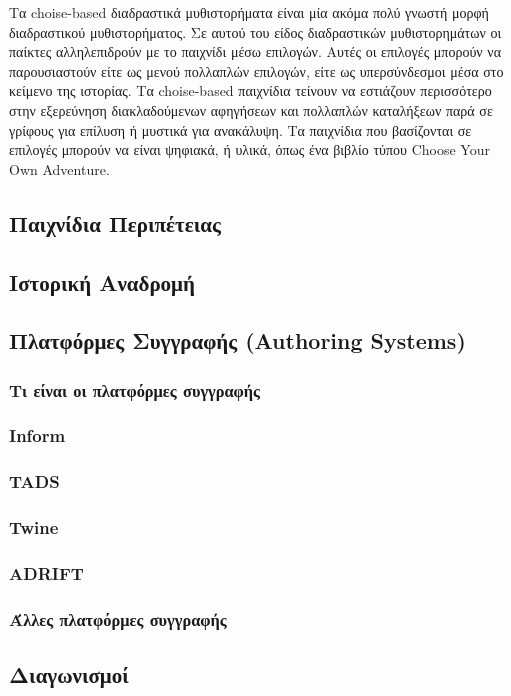 \noindent
Τα choise-based διαδραστικά μυθιστορήματα είναι μία ακόμα πολύ γνωστή μορφή διαδραστικού μυθιστορήματος. Σε αυτού του είδος διαδραστικών μυθιστορημάτων οι παίκτες αλληλεπιδρούν με το παιχνίδι μέσω επιλογών. Αυτές οι επιλογές μπορούν να παρουσιαστούν είτε ως μενού πολλαπλών επιλογών, είτε ως υπερσύνδεσμοι μέσα στο κείμενο της ιστορίας. Τα choise-based παιχνίδια τείνουν να εστιάζουν περισσότερο στην εξερεύνηση διακλαδούμενων αφηγήσεων και πολλαπλών καταλήξεων παρά σε γρίφους για επίλυση ή μυστικά για ανακάλυψη. Τα παιχνίδια που βασίζονται σε επιλογές μπορούν να είναι ψηφιακά, ή υλικά, όπως ένα βιβλίο τύπου Choose Your Own Adventure.\\

\subsection{Παιχνίδια Περιπέτειας}
\subsection{Ιστορική Αναδρομή}
\subsection{Πλατφόρμες Συγγραφής (Authoring Systems)}
\subsubsection{Τι είναι οι πλατφόρμες συγγραφής}
\subsubsection{Inform}
\subsubsection{TADS}
\subsubsection{Twine}
\subsubsection{ADRIFT}
\subsubsection{Άλλες πλατφόρμες συγγραφής}
\subsection{Διαγωνισμοί}
